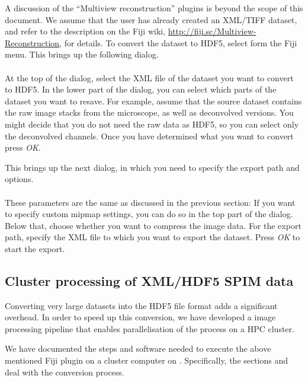 \documentclass{scrartcl}
\begin{document}
A discussion of the ``Multiview reconstruction'' plugins is beyond the scope of this document.
We assume that the user has already created an XML/TIFF dataset, and refer to the description on the Fiji wiki,
  \href{http://fiji.sc/Multiview-Reconstruction}{\url{http://fiji.sc/Multiview-Reconstruction}}, for details.
To convert the dataset to HDF5, select  form the Fiji menu.
This brings up the following dialog.
\\
\\
At the top of the dialog, select the XML file of the dataset you want to convert to HDF5.
In the lower part of the dialog, you can select which parts of the dataset you want to resave.
For example, assume that the source dataset contains the raw image stacks from the microscope, as well as deconvolved versions.
You might decide that you do not need the raw data as HDF5, so you can select only the deconvolved channels.
Once you have determined what you want to convert press \emph{OK}.

This brings up the next dialog, in which you need to specify the export path and options.
\\
\\
These parameters are the same as discussed in the previous section:
If you want to specify custom mipmap settings, you can do so in the top part of the dialog.
Below that, choose whether you want to compress the image data.
For the export path, specify the XML file to which you want to export the dataset.
Press \emph{OK} to start the export.

%
\subsection{Cluster processing of XML/HDF5 SPIM data}

Converting very large datasets into the HDF5 file format adds a significant overhead.
In order to speed up this conversion, we have developed a image processing pipeline that enables parallelisation of the process on a HPC cluster.

We have documented the steps and software needed to execute the above mentioned Fiji plugin on a cluster computer on
\href{http://fiji.sc/SPIM_Registration_on_cluster}{}. Specifically, the sections
\href{http://fiji.sc/SPIM_Registration_on_cluster#Define_XML}{} and
\href{http://fiji.sc/SPIM_Registration_on_cluster#Re-save_as_HDF5}{} deal with the conversion process.
\end{document}
